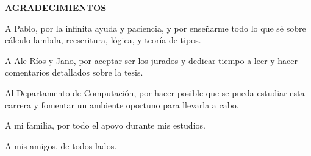 \begin{center}
  \textbf{AGRADECIMIENTOS}
\end{center}

A Pablo, por la infinita ayuda y paciencia, y por enseñarme todo lo que sé sobre cálculo lambda, reescritura, lógica, y teoría de tipos.

A Ale Ríos y Jano, por aceptar ser los jurados y dedicar tiempo a leer y hacer comentarios detallados sobre la tesis.

Al Departamento de Computación, por hacer posible que se pueda estudiar esta carrera y fomentar un ambiente oportuno para llevarla a cabo.

A mi familia, por todo el apoyo durante mis estudios.

A mis amigos, de todos lados.
